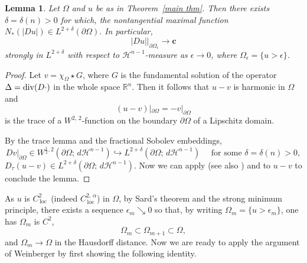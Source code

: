 \documentclass[reqno,11pt]{amsart}
\makeatletter
\def\az{\alpha}
\def\loc{{\mathop\mathrm{\,loc\,}}}
\def\dz{\delta}
\def\ez{\epsilon}
\newtheorem{lem}[thm]{Lemma}%
\numberwithin{equation}{section}
\theoremstyle{remark}
\makeatother
\begin{document}
\begin{lem}\label{convergence Laplacian}
        Let $\Omega$ and $u$  be  as in Theorem~\ref{main thm}. Then there exists $\delta=\delta(n)>0$ for which,  the nontangential maximal function 
    $N_*(|Du|)\in L^{2+\delta }(\partial\Omega).$
    In particular, 
    $$|Du|\bigg|_{\partial \Omega_\ez} \to \mathbf{c}$$
      strongly in $L^{2+\delta}$ with respect to $\mathscr H^{n-1}$-measure as $\ez\to 0$, where $\Omega_\ez=\{u>\ez\}$. 
\end{lem}
\begin{proof}
Let $v=\chi_{\Omega}\star G$, where $G$ is the fundamental solution of the operator $\Delta={\rm div}(D\cdot)$ in the whole space $\mathbb R^n$.   Then it follows that $u-v$ is  harmonic in $\Omega$ and 
$$(u-v)|_{\partial\Omega}=-v|_{\partial\Omega}$$ 
is the trace of a $W^{2,\,2}$-function on the boundary $\partial\Omega$ of a Lipschitz domain. 

By the trace lemma and the fractional Sobolev embeddings,
$$Dv|_{\partial\Omega}\in W^{\frac 1 2, 2}(\partial\Omega;\,d\mathscr H^{n-1})\hookrightarrow L^{2+\delta}(\partial\Omega;\,d\mathscr H^{n-1})\quad \text{ for some } \dz=\dz(n)>0,$$
$D_\tau(u-v)\in L^{2+\delta}(\partial\Omega;\,d\mathscr H^{n-1})$. 
Now we can apply \cite{V1984} (see also \cite[(1.4)]{DK1987}) and \cite[Theorem 6.17]{KP1993} to $u-v$ to conclude the lemma. 
\end{proof}


As $u$ is $C^2_{\loc}$ (indeed $C^{2,\,\az}_{\loc}$) in $\Omega$, by Sard's theorem and the strong minimum principle, there exists a sequence $\ez_m\searrow 0$ so that, 
by writing $\Omega_{m}=\{u>\ez_m\}$, one has $\Omega_m$ is $C^2$,
$$\Omega_m\subset \Omega_{m+1}\subset \Omega, $$
and $\Omega_m\to \Omega$ in the Hausdorff distance. Now we are ready to apply the argument of Weinberger by first showing the following identity. 
\end{document}
